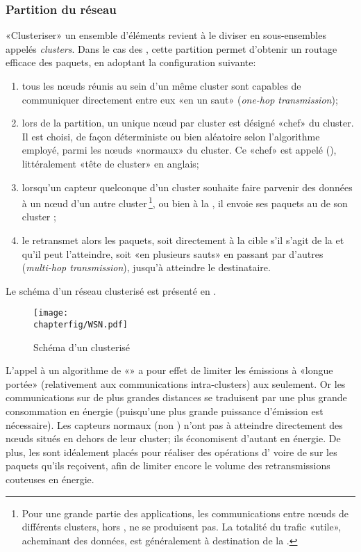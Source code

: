         \subsubsection{Partition du réseau}
«Clusteriser» un ensemble d'éléments revient à le diviser en sous-ensembles appelés \textit{clusters}.
Dans le cas des \rcsfs, cette partition permet d'obtenir un routage efficace des paquets, en adoptant la configuration suivante:
\begin{enumerate}
    \item tous les nœuds réunis au sein d'un même cluster sont capables de communiquer directement entre eux «en un saut» (\textit{one-hop transmission});
    \item lors de la partition, un unique nœud par cluster est désigné «chef» du cluster.
        Il est choisi, de façon déterministe ou bien aléatoire selon l'algorithme employé, parmi les nœuds «normaux» du cluster.
        Ce «chef» est appelé \textit{\ch} (\CH), littéralement «tête de cluster» en anglais;
    \item lorsqu'un capteur quelconque d'un cluster souhaite faire parvenir des données à un nœud d'un autre cluster\,\footnote{Pour une grande partie des applications, les communications entre nœuds de différents clusters, hors \chs, ne se produisent pas. La totalité du trafic «utile», acheminant des données, est généralement à destination de la \sdb.}, ou bien à la \sdb, il envoie ses paquets au \ch de son cluster ;
    \item le \ch retransmet alors les paquets, soit directement à la cible s'il s'agit de la \sdb et qu'il peut l'atteindre, soit «en plusieurs sauts» en passant par d'autres \chs (\textit{multi-hop transmission}), jusqu'à atteindre le destinataire.
\end{enumerate}
Le schéma d'un réseau clusterisé est présenté en .
\begin{figure}[!ht]
    \centering
    \texttt{[image: \\chapterfig/WSN.pdf]}
    \caption{Schéma d'un \rc clusterisé}\label{st:fig:wsn}
\end{figure}

L'appel à un algorithme de «» a pour effet de limiter les émissions à «longue portée» (relativement aux communications intra-clusters) aux \chs seulement.
Or les communications sur de plus grandes distances se traduisent par une plus grande consommation en énergie (puisqu'une plus grande puissance d'émission est nécessaire).
Les capteurs normaux (non \chs) n'ont pas à atteindre directement des nœuds situés en dehors de leur cluster; ils économisent d'autant en énergie.
De plus, les \chs sont idéalement placés pour réaliser des opérations d' voire de  sur les paquets qu'ils reçoivent, afin de limiter encore le volume des retransmissions couteuses en énergie.

